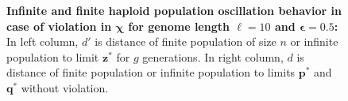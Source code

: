 \begin{figure}[h]
\begin{center}
\hspace{-3em}%
\vspace{-0.5em} \hspace{-3em}%

\caption[\textbf{Infinite and finite haploid population oscillation behavior in case of violation in $\bm{\chi}$ for genome length $\ell = 10$ and $\bm{\epsilon} = 0.5$}]{\textbf{Infinite and finite haploid population oscillation behavior in case of violation in $\bm{\chi}$ for genome length $\ell = 10$ and $\bm{\epsilon} = 0.5$:} 
  In left column, $d'$ is distance of finite population of size $n$ or infinite population to limit $\bm{z}^\ast$ for $g$ generations. In right column, $d$ is distance of finite population or infinite population to limits $\bm{p}^\ast$ and $\bm{q}^\ast$ without violation.}
\label{oscillation_10h_vio_chi_0.5}
\end{center}
\end{figure}

